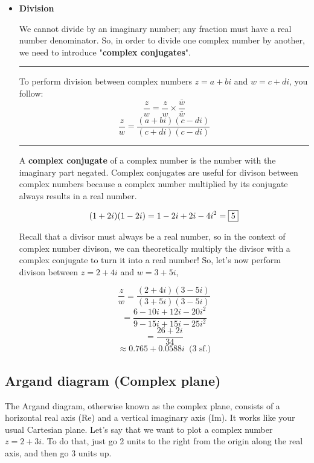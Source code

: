 \documentclass{article}
\begin{document}
\begin{itemize}
    \item \textbf{Division}
    
    We cannot divide by an imaginary number; any fraction must have a real number denominator. So, in order to divide one complex number by another, we need to introduce "\textbf{complex conjugates}".
    \begin{center}
    \rule{10cm}{0.4pt}

        
        To perform division between complex numbers $z=a+bi$ and $w=c+di$, you follow:
        $$\frac{z}{w}=\frac{z}{w} \times \frac{\bar{w}}{\bar{w}}$$
        $$\frac{z}{w}=\frac{(a+bi)(c-di)}{(c+di)(c-di)}$$
    
    \rule{10cm}{0.4pt}  
    \end{center}

    A \textbf{complex conjugate} of a complex number is the number with the imaginary part negated.
    Complex conjugates are useful for divison between
    complex numbers because a complex number multiplied
    by its conjugate always results in a real number. 
    
    $$(1+2i)(1-2i)=1-2i+2i-4i^2=\fbox{5}$$

    Recall that a divisor must always be a real number, so in the
    context of complex number divison, we can theoretically multiply
    the divisor with a complex conjugate to turn it into a real number! So, let's now
    perform divison between $z=2+4i$ and $w=3+5i$,

    $$\frac{z}{w}=\frac{(2+4i)(3-5i)}{(3+5i)(3-5i)}$$
    $$=\frac{6-10i+12i-20i^2}{9-15i+15i-25i^2}$$
    $$=\frac{26+2i}{34}$$
    $$\approx 0.765+0.0588i \phantom{1} \text{(3 sf.)}$$

\end{itemize}

\subsection{Argand diagram (Complex plane)}

The Argand diagram, otherwise known as the complex plane, consists of a horizontal real axis (Re) and a vertical imaginary axis (Im). It works like your usual Cartesian plane. Let's say that we want to plot a complex number $z=2+3i$. To do that, just go 2 units to the right from the origin along the real axis, and then go 3 units up.
\end{document}
